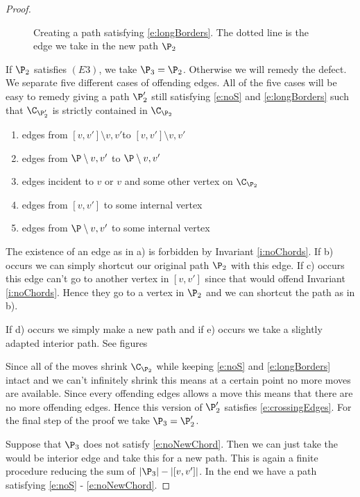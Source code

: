 \begin{proof}
\begin{figure}
    \caption{Creating a path satisfying \ref{e:longBorders}. The dotted line is the edge we take in the new path $\P_2$}\label{fig:E2}
\end{figure}

\newcommand{\intvv}{\ensuremath{[v,v']\setminus{v,v'}}}
\newcommand{\intP}{\ensuremath{\P\setminus{v,v'}}}

If $\P_2$ satisfies $(E3)$, we take $\P_3 = \P_2$. Otherwise we will remedy the defect. We separate five different cases of offending edges. All of the five cases will be easy to remedy giving a path $\P'_2$ still satisfying \ref{e:noS} and \ref{e:longBorders} such that $\C_{\P'_2}$ is strictly contained in $\C_{\P_2}$ %
\begin{enumerate}
 \renewcommand*{\labelenumi}{\alph{enumi})}%
 \renewcommand*{\theenumi}{\alph{enumi})}%
 \item edges from \intvv to $\intvv$
 \item edges from $\intP$ to $\intP$
 \item edges incident to $v$ or $v$ and some other vertex on $\C_{\P_2}$
 \item edges from $[v,v']$ to some internal vertex
 \item edges from $\intP$ to some internal vertex
\end{enumerate}

The existence of an edge as in a) is forbidden by Invariant \ref{i:noChords}. If b) occurs we can simply shortcut our original path $\P_2$ with this edge. If c) occurs this edge can't go to another vertex in $[v,v']$ since that would offend Invariant \ref{i:noChords}. Hence they go to a vertex in $\P_2$ and we can shortcut the path as in b).

If d) occurs we simply make a new path and if e) occurs we take a slightly adapted interior path. See figures


Since all of the moves shrink $\C_{\P_2}$ while keeping \ref{e:noS} and \ref{e:longBorders} intact and we can't infinitely shrink this means at a certain point no more moves are available. Since every offending edges allows a move this means that there are no more offending edges. Hence this version of $\P'_2$ satisfies \ref{e:crossingEdges}. For the final step of the proof we take $\P_3 = \P'_2$.


Suppose that $\P_3$ does not satisfy \ref{e:noNewChord}. Then we can just take the would be interior edge and take this for a new path. This is again a finite procedure reducing the sum of $|\P_3| -|[v,v']|$. In the end we have a path satisfying \ref{e:noS} - \ref{e:noNewChord}.



\end{proof}


